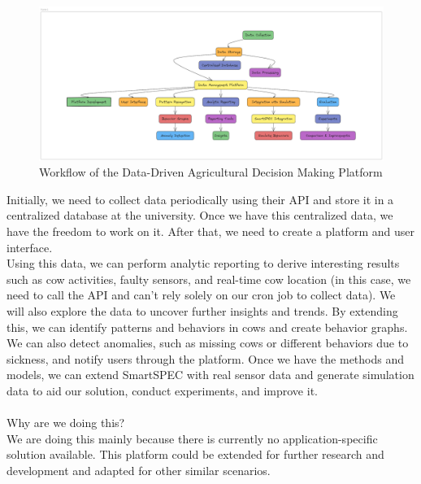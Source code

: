 \documentclass[11pt]{article}
\begin{document}
\begin{figure}[h!]
    \centering
    \includegraphics[width=\textwidth]{workflow.png}
    \caption{Workflow of the Data-Driven Agricultural Decision Making Platform}
    \label{fig:workflow}
\end{figure}
Initially, we need to collect data periodically using their API and store it in a centralized database at the university. Once we have this centralized data, we have the freedom to work on it.
After that, we need to create a platform and user interface.\\
Using this data, we can perform analytic reporting to derive interesting results such as cow activities, faulty sensors, and real-time cow location (in this case, we need to call the API and can't rely solely on our cron job to collect data). We will also explore the data to uncover further insights and trends.
By extending this, we can identify patterns and behaviors in cows and create behavior graphs.\\
We can also detect anomalies, such as missing cows or different behaviors due to sickness, and notify users through the platform.
Once we have the methods and models, we can extend SmartSPEC with real sensor data and generate simulation data to aid our solution, conduct experiments, and improve it.\\ \\
Why are we doing this?\\
We are doing this mainly because there is currently no application-specific solution available. This platform could be extended for further research and development and adapted for other similar scenarios.\\
\end{document}
